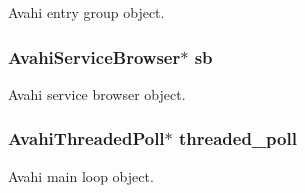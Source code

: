 \-Avahi entry group object. 

\hypertarget{avahi-discovery_8h_a776323ceddd7220f0903d292ab164031}{
\subsubsection[{sb}]{\setlength{\rightskip}{0pt plus 5cm}\-Avahi\-Service\-Browser$\ast$ {\bf sb}}}\label{avahi-discovery_8h_a776323ceddd7220f0903d292ab164031}


\-Avahi service browser object. 

\hypertarget{avahi-discovery_8h_adf324f226aa01dbc2ed8b2081a2f389a}{
\subsubsection[{threaded\-\_\-poll}]{\setlength{\rightskip}{0pt plus 5cm}\-Avahi\-Threaded\-Poll$\ast$ {\bf threaded\-\_\-poll}}}\label{avahi-discovery_8h_adf324f226aa01dbc2ed8b2081a2f389a}


\-Avahi main loop object. 

